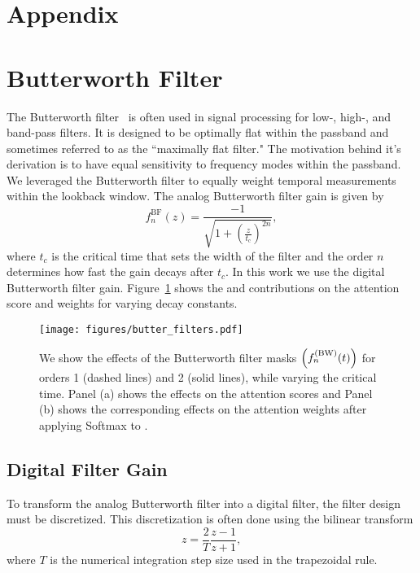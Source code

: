 \appendix
\section*{Appendix}

\section{Butterworth Filter}

The Butterworth filter~\cite{butterworth.filter.1930} is often used in signal processing for low-, high-, and band-pass filters.
It is designed to be optimally flat within the passband and sometimes referred to as the ``maximally flat filter."
The motivation behind it's derivation is to have equal sensitivity to frequency modes within the passband.
We leveraged the Butterworth filter to equally weight temporal measurements within the lookback window.
The analog Butterworth filter gain is given by 
\begin{equation}
    f^{\text{BF}}_n(z) = \frac{-1}{\sqrt{1 + \left( \frac{z}{t_\text{c}} \right)^{2n}}} ,
\end{equation}
where $t_c$ is the critical time that sets the width of the filter and the order $n$ determines how fast the gain decays after $t_c$.
In this work we use the digital Butterworth filter gain.
Figure~\ref{fig:maskBF} shows the \fbwo{} and \fbwt{} contributions on the attention score and weights for varying decay constants.

\begin{figure}[!h]
\centering
\texttt{[image: figures/butter\_filters.pdf]}
\caption{We show the effects of the Butterworth filter masks $\left( f^{(\text{BW})}_n(t) \right)$ for orders 1 (dashed lines) and 2 (solid lines), while varying the critical time. 
Panel (a) shows the effects on the attention scores and Panel (b) shows the corresponding effects on the attention weights after applying Softmax to \fbwn.}
\label{fig:maskBF}
\end{figure}

\subsection{Digital Filter Gain\label{sc:butterGain}}
To transform the analog Butterworth filter into a digital filter, the filter design must be discretized.
This discretization is often done using the bilinear transform
\begin{equation}
    z = \frac{2}{T}\frac{z-1}{z+1} ,
\end{equation}
where $T$ is the numerical integration step size used in the trapezoidal rule.

